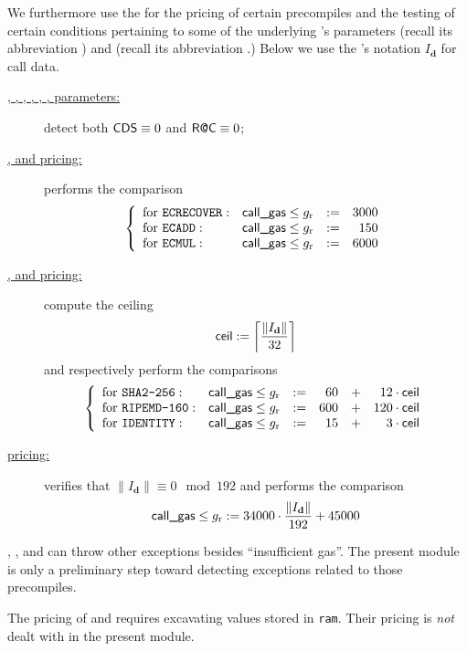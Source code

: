 We furthermore use the \oobMod{} for the pricing of certain precompiles and the testing of certain conditions pertaining to some of the underlying 's parameters
\CDS{} (recall its abbreviation \cds{}) and
\RAC{} (recall its abbreviation \rac{}.)
\saNote{} Below we use the \cite{EYP}'s notation $I_\textbf{d}$ for call data.
\begin{description}
	\item[\underline{, , , , , ,  parameters:}]
		detect both $\textsf{CDS} \equiv 0$ and $\textsf{R@C} \equiv 0$; 
	\item[\underline{,  and  pricing:}]
		performs the comparison
		\[
			\left\{ \begin{array}{llcrcl}
				\text{for }\texttt{ECRECOVER}   : & \textsf{call\_gas} \leq g_\text{r} & := & 3000 \\
				\text{for }\texttt{ECADD}       : & \textsf{call\_gas} \leq g_\text{r} & := &  150 \\
				\text{for }\texttt{ECMUL}       : & \textsf{call\_gas} \leq g_\text{r} & := & 6000 \\
			\end{array} \right.
		\]
	\item[\underline{,  and  pricing:}]
		compute the ceiling
		\[ \textsf{ceil} := \left \lceil \frac{\| I_\textbf{d} \|}{32} \right \rceil \]
		and respectively perform the comparisons
		\[
			\left\{ \begin{array}{llcrcr}
				\text{for }\texttt{SHA2-256}   : & \textsf{call\_gas} \leq g_\text{r} & := & 60  & + & 12  \cdot \textsf{ceil}  \\
				\text{for }\texttt{RIPEMD-160} : & \textsf{call\_gas} \leq g_\text{r} & := & 600 & + & 120 \cdot \textsf{ceil}  \\
				\text{for }\texttt{IDENTITY}   : & \textsf{call\_gas} \leq g_\text{r} & := & 15  & + & 3   \cdot \textsf{ceil}  \\
			\end{array} \right.
		\]
	\item[\underline{ pricing:}]
		verifies that $\| I_\textbf{d} \| \equiv 0 \mod 192$ and performs the comparison 
		\[ \textsf{call\_gas} \leq g_\text{r} := 34000 \cdot \frac{\| I_\textbf{d} \|}{192} + 45000 \]
\end{description}

\saNote{}
, ,  and  can throw other exceptions besides ``insufficient gas''.
The present module is only a preliminary step toward detecting exceptions related to those precompiles.

\saNote{} The pricing of  and  requires excavating values stored in \texttt{ram}. Their pricing is \emph{not} dealt with in the present module. 
